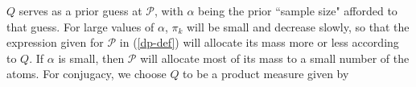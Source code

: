$Q$ serves as a prior guess at $\mathcal{P}$, with $\alpha$ being the prior ``sample size" afforded to that guess. For large values of $\alpha$, $\pi_k$ will be small and decrease slowly, so that the expression given for $\mathcal{P}$ in (\ref{dp-def}) will allocate its mass more or less according to $Q$. If $\alpha$ is small, then $\mathcal{P}$ will allocate most of its mass to a small number of the atoms. For conjugacy, we choose $Q$ to be a product measure given by
%
%

